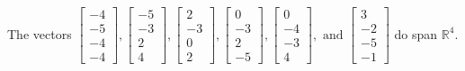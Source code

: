 \begin{exercise}
\begin{exerciseStatement}
  \end{exerciseStatement}
  \begin{exerciseAnswer}
   The vectors \(\left[\begin{array}{r}
-4 \\
-5 \\
-4 \\
-4
\end{array}\right] , \left[\begin{array}{r}
-5 \\
-3 \\
2 \\
4
\end{array}\right] , \left[\begin{array}{r}
2 \\
-3 \\
0 \\
2
\end{array}\right] , \left[\begin{array}{r}
0 \\
-3 \\
2 \\
-5
\end{array}\right] , \left[\begin{array}{r}
0 \\
-4 \\
-3 \\
4
\end{array}\right] , \text{ and } \left[\begin{array}{r}
3 \\
-2 \\
-5 \\
-1
\end{array}\right]\) 
  	 do  
	span \(\mathbb{R}^4\).
  


  \end{exerciseAnswer}
\end{exercise}